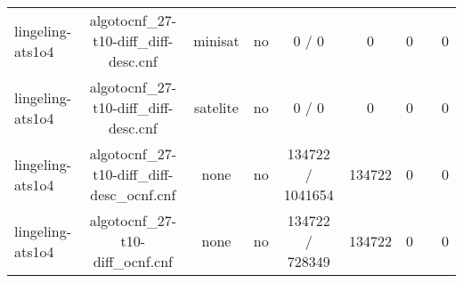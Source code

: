 \begin{appendices}
\begin{table}[p]
\begin{center}
\begin{tabular}{l|cccccccc}
  lingeling-ats1o4               & algotocnf\_27-t10-diff\_diff-desc.cnf & minisat    & no    & 0 / 0      & 0         & 0         &            & 0 \\ %
  lingeling-ats1o4               & algotocnf\_27-t10-diff\_diff-desc.cnf & satelite   & no    & 0 / 0      & 0         & 0         &            & 0 \\ %
  lingeling-ats1o4               & algotocnf\_27-t10-diff\_diff-desc\_ocnf.cnf & none       & no    & 134722 / 1041654 & 134722    & 0         &            & 0 \\ %
  lingeling-ats1o4               & algotocnf\_27-t10-diff\_ocnf.cnf & none       & no    & 134722 / 728349 & 134722    & 0         &            & 0 \\ %
    \end{tabular}
  \end{center}
\end{table}

\newpage


\end{appendices}
